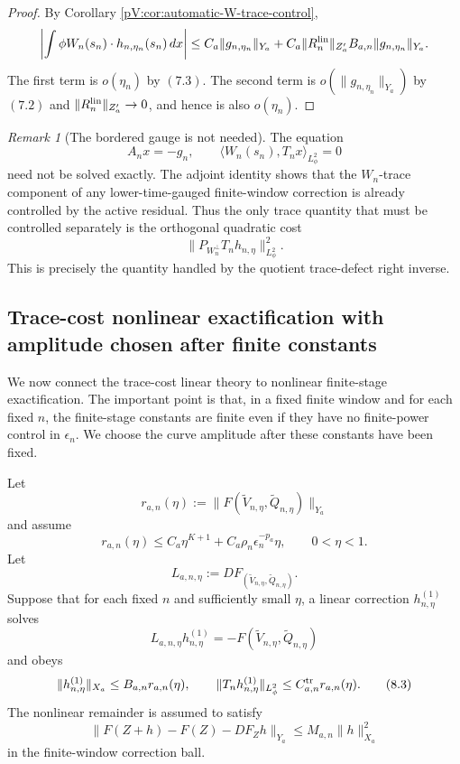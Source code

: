 \documentclass[11pt]{article}
\numberwithin{equation}{section}
\theoremstyle{plain}
\theoremstyle{definition}
\theoremstyle{remark}
\newtheorem{remark}{Remark}[section]
\begin{document}
\begin{proof}
By Corollary \ref{pV:cor:automatic-W-trace-control},
\[
        \left|
        \int\phi W_n(s_n)\cdot h_{n,\eta_n}(s_n)\,dx
        \right|
        \le
        C_a\|g_{n,\eta_n}\|_{Y_a}
        +
        C_a\|R_n^{\rm lin}\|_{Z_a'}B_{a,n}\|g_{n,\eta_n}\|_{Y_a}.
\]
The first term is \(o(\eta_n)\) by \((7.3)\).  The second term is
\(o(\|g_{n,\eta_n}\|_{Y_a})\) by \((7.2)\) and \(\|R_n^{\rm lin}\|_{Z_a'}\to0\), and hence is also \(o(\eta_n)\).
\end{proof}

\begin{remark}[The bordered gauge is not needed]
The equation
\[
        A_nx=-g_n,
        \qquad
        \langle W_n(s_n),T_nx\rangle_{L^2_\phi}=0
\]
need not be solved exactly.  The adjoint identity shows that the \(W_n\)-trace component of any lower-time-gauged finite-window correction is already controlled by the active residual.  Thus the only trace quantity that must be controlled separately is the orthogonal quadratic cost
\[
        \|P_{W_n^\perp}T_nh_{n,\eta}\|_{L^2_\phi}^2.
\]
This is precisely the quantity handled by the quotient trace-defect right inverse.
\end{remark}

\subsection{Trace-cost nonlinear exactification with amplitude chosen after finite constants}
\label{pV:sec:trace-cost-newton-exactification-amplitude}

We now connect the trace-cost linear theory to nonlinear finite-stage exactification.  The important point is that, in a fixed finite window and for each fixed \(n\), the finite-stage constants are finite even if they have no finite-power control in \(\epsilon_n\).  We choose the curve amplitude after these constants have been fixed.

Let
\[
        r_{a,n}(\eta)
        :=
        \|F(\widetilde V_{n,\eta},\widetilde Q_{n,\eta})\|_{Y_a}
\]
and assume
\[
        r_{a,n}(\eta)
        \le
        C_a\eta^{K+1}+C_a\rho_n\epsilon_n^{-p_a}\eta,
        \qquad 0<\eta<1.
        \tag{8.1}
\]
Let
\[
        L_{a,n,\eta}:=DF_{(\widetilde V_{n,\eta},\widetilde Q_{n,\eta})}.
\]
Suppose that for each fixed \(n\) and sufficiently small \(\eta\), a linear correction \(h^{(1)}_{n,\eta}\) solves
\[
        L_{a,n,\eta}h^{(1)}_{n,\eta}
        =-F(\widetilde V_{n,\eta},\widetilde Q_{n,\eta})
        \tag{8.2}
\]
and obeys
\[
        \|h^{(1)}_{n,\eta}\|_{X_a}\le B_{a,n}r_{a,n}(\eta),
        \qquad
        \|T_nh^{(1)}_{n,\eta}\|_{L^2_\phi}\le C^{\rm tr}_{a,n}r_{a,n}(\eta).
        \tag{8.3}
\]
The nonlinear remainder is assumed to satisfy
\[
        \|F(Z+h)-F(Z)-DF_Zh\|_{Y_a}\le M_{a,n}\|h\|_{X_a}^2
        \tag{8.4}
\]
in the finite-window correction ball.
\end{document}
